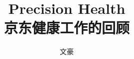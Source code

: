



\title[Precision Health]{\huge{Precision Health}  \\
\medskip
\small{京东健康工作的回顾}
} %

\author[文豪]{文豪} %




\setlength{\belowdisplayskip}{5pt} \setlength{\belowdisplayshortskip}{5pt}
\setlength{\abovedisplayskip}{5pt} \setlength{\abovedisplayshortskip}{5pt}


\begin{frame}
\titlepage %
\end{frame}


\begin{frame}
\tableofcontents %
\end{frame}


